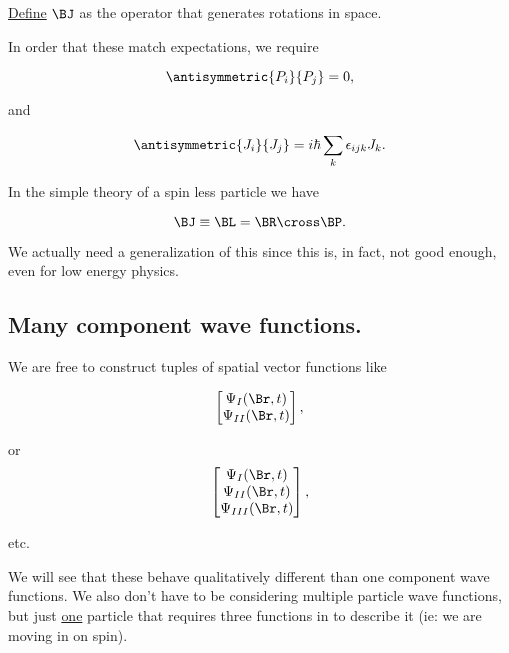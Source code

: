 \underline{Define} $\BJ$ as the operator that generates rotations in space.

In order that these match expectations, we require

\begin{equation}\label{eqn:qmTwoL11:490}
\antisymmetric{P_i}{P_j} = 0,
\end{equation}

and

\begin{equation}\label{eqn:qmTwoL11:510}
\antisymmetric{J_i}{J_j} = i \hbar \sum_k \epsilon_{ijk} J_k.
\end{equation}

In the simple theory of a spin less particle we have

\begin{equation}\label{eqn:qmTwoL11:530}
\BJ \equiv \BL = \BR \cross \BP.
\end{equation}

We actually need a generalization of this since this is, in fact, not good enough, even for low energy physics.

\subsection{Many component wave functions.}

We are free to construct tuples of spatial vector functions like

\begin{equation}\label{eqn:qmTwoL11:550}
\begin{bmatrix}
\Psi_I(\Br, t) \\
\Psi_{II}(\Br, t)
\end{bmatrix},
\end{equation}

or
\begin{equation}\label{eqn:qmTwoL11:570}
\begin{bmatrix}
\Psi_I(\Br, t) \\
\Psi_{II}(\Br, t) \\
\Psi_{III}(\Br, t)
\end{bmatrix},
\end{equation}

etc.

We will see that these behave qualitatively different than one component wave functions.  We also don't have to be considering multiple particle wave functions, but just \underline{one} particle that requires three functions in  to describe it (ie: we are moving in on spin).


